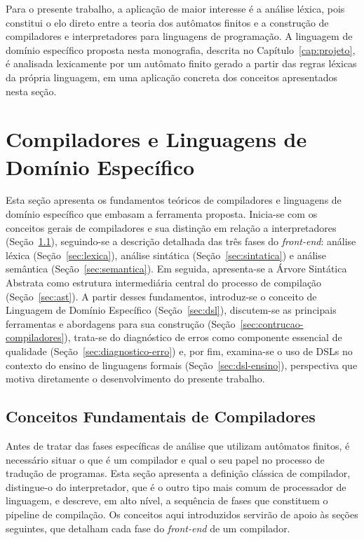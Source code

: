\documentclass[
    12pt
    ,oneside
    ,a4paper
    ,chapter=TITLE
    ,section=TITLE
    ,sumario=abnt-6027-2012]{abntex2}
\begin{document}
Para o presente trabalho, a aplicação de maior interesse é a análise léxica, pois constitui o
elo direto entre a teoria dos autômatos finitos e a construção de compiladores e
interpretadores para linguagens de programação. A linguagem de domínio específico proposta
nesta monografia, descrita no Capítulo~\ref{cap:projeto}, é analisada
lexicamente por um autômato finito gerado a partir das regras léxicas da própria linguagem,
em uma aplicação concreta dos conceitos apresentados nesta seção.


\section{Compiladores e Linguagens de Domínio Específico}
\label{cap:compiladores}
Esta seção apresenta os fundamentos teóricos de compiladores e linguagens de domínio 
específico que embasam a ferramenta proposta. Inicia-se com os conceitos gerais de compiladores 
e sua distinção em relação a interpretadores (Seção~\ref{sec:conceitos-compiladores}), 
seguindo-se a descrição detalhada das três fases do \textit{front-end}: análise léxica 
(Seção~\ref{sec:lexica}), análise sintática (Seção~\ref{sec:sintatica}) e análise semântica 
(Seção~\ref{sec:semantica}). Em seguida, apresenta-se a Árvore Sintática Abstrata como 
estrutura intermediária central do processo de compilação (Seção~\ref{sec:ast}). A partir 
desses fundamentos, introduz-se o conceito de Linguagem de Domínio Específico 
(Seção~\ref{sec:dsl}), discutem-se as principais ferramentas e abordagens para sua construção 
(Seção~\ref{sec:contrucao-compiladores}), trata-se do diagnóstico de erros como componente 
essencial de qualidade (Seção~\ref{sec:diagnostico-erro}) e, por fim, examina-se o uso de DSLs 
no contexto do ensino de linguagens formais (Seção~\ref{sec:dsl-ensino}), perspectiva que 
motiva diretamente o desenvolvimento do presente trabalho.

\subsection{Conceitos Fundamentais de Compiladores}
\label{sec:conceitos-compiladores}
Antes de tratar das fases específicas de análise que utilizam autômatos finitos, é necessário
situar o que é um compilador e qual o seu papel no processo de tradução de programas. Esta seção
apresenta a definição clássica de compilador, distingue-o do interpretador, que é o outro tipo
mais comum de processador de linguagem, e descreve, em alto nível, a sequência de fases que
constituem o pipeline de compilação. Os conceitos aqui introduzidos servirão de apoio às seções
seguintes, que detalham cada fase do \textit{front-end} de um compilador.
\end{document}
